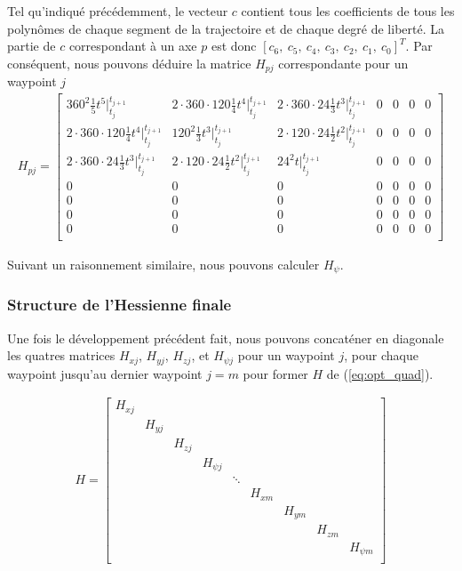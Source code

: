 \documentclass{article}
\begin{document}
Tel qu'indiqué précédemment, le vecteur $c$ contient tous les coefficients de tous les polynômes de chaque segment de la trajectoire et de chaque degré de liberté. La partie de $c$ correspondant à un axe $p$ est donc $[c_6,\ c_5,\ c_4,\ c_3,\ c_2,\ c_1,\ c_0]^T$. Par conséquent, nous pouvons déduire la matrice $H_{pj}$ correspondante pour un waypoint $j$
\begin{align*}
H_{pj} =
\begin{bmatrix}
    360^2 \frac{1}{5} t^5 \Big|_{t_j}^{t_{j+1}}
    		& 2 \cdot 360 \cdot 120 \frac{1}{4} t^4\Big|_{t_j}^{t_{j+1}}
    		& 2 \cdot 360 \cdot 24 \frac{1}{3} t^3\Big|_{t_j}^{t_{j+1}}
    		& 0
    		& 0
    		& 0
	    	& 0 \\
    2 \cdot 360 \cdot 120 \frac{1}{4} t^4\Big|_{t_j}^{t_{j+1}}
    		& 120^2 \frac{1}{3} t^3\Big|_{t_j}^{t_{j+1}} 
    		& 2 \cdot 120 \cdot 24 \frac{1}{2}t^2 \Big|_{t_j}^{t_{j+1}} & 0 & 0 & 0 & 0\\
	2 \cdot 360 \cdot 24 \frac{1}{3} t^3\Big|_{t_j}^{t_{j+1}}
		& 2 \cdot 120 \cdot 24 \frac{1}{2}t^2 \Big|_{t_j}^{t_{j+1}} 
		& 24^2 t\Big|_{t_j}^{t_{j+1}} & 0 & 0 & 0 & 0 \\
    0 & 0 & 0 & 0 & 0 & 0 & 0 \\
    0 & 0 & 0 & 0 & 0 & 0 & 0 \\
    0 & 0 & 0 & 0 & 0 & 0 & 0 \\
    0 & 0 & 0 & 0 & 0 & 0 & 0 \\
\end{bmatrix}
\end{align*}

Suivant un raisonnement similaire, nous pouvons calculer $H_\psi$.

\subsubsection{Structure de l'Hessienne finale}

Une fois le développement précédent fait, nous pouvons concaténer en diagonale les quatres matrices $H_{xj}$, $H_{yj}$, $H_{zj}$, et $H_{\psi j}$ pour un waypoint $j$, pour chaque waypoint jusqu'au dernier waypoint $j=m$ pour former $H$ de (\ref{eq:opt_quad}).

\begin{align}
H=
\begin{bmatrix}
	H_{xj} \\
	&	H_{yj} \\
	&	&		H_{zj} \\
	&	&		&		H_{\psi j} \\
	&	&		&		&			\ddots \\
	&	&		&		&			&		H_{xm} \\
	&	&		&		&			&		&		H_{ym} \\
	&	&		&		&			&		&		&		H_{zm} \\
	&	&		&		&			&		&		&		&		H_{\psi m} \\
\end{bmatrix}
\end{align}
\end{document}
